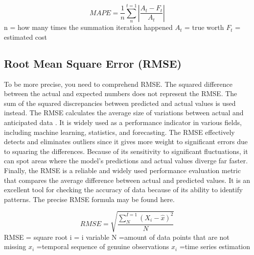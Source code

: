 \begin{equation}
MAPE = \frac{1}{n}\sum_{n}^{t=1}|\frac{A_t-F_t}{A_t}|
\end{equation}
n = how many times the summation iteration happened
${A_t}$ = true worth
${F_t }$ = estimated cost



\subsection{Root Mean Square Error (RMSE)}
To be more precise, you need to comprehend RMSE. The squared difference between the actual and expected numbers does not represent the RMSE. The sum of the squared discrepancies between predicted and actual values is used instead. The RMSE calculates the average size of variations between actual and anticipated data \cite{mellit201024}. It is widely used as a performance indicator in various fields, including machine learning, statistics, and forecasting. The RMSE effectively detects and eliminates outliers since it gives more weight to significant errors due to squaring the differences. Because of its sensitivity to significant fluctuations, it can spot areas where the model's predictions and actual values diverge far faster. Finally, the RMSE is a reliable and widely used performance evaluation metric that compares the average difference between actual and predicted values. It is an excellent tool for checking the accuracy of data because of its ability to identify patterns. The precise RMSE formula may be found here\cite{abuella2015solar}.

\begin{equation}
RMSE = \sqrt{\frac{\sum_{N}^{I=1}(X_i-\hat{x})^{2}}{N}}
\end{equation}
RMSE = square root
i = i variable
N =amount of data points that are not missing
${x_i}$ =temporal sequence of genuine observations
${x_i}$ =time series estimation

